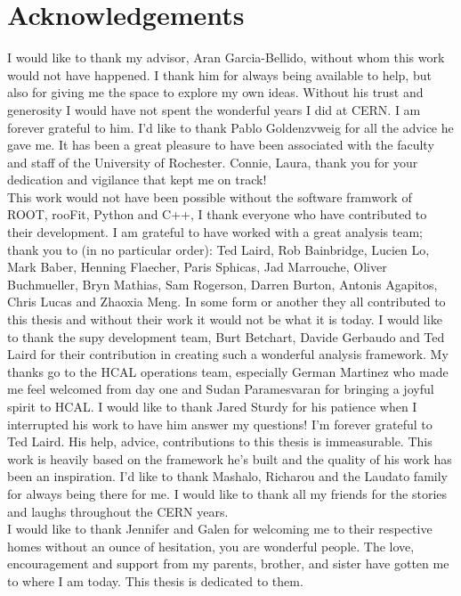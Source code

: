 \section*{Acknowledgements}

\indent I would like to thank my advisor, Aran Garcia-Bellido, without whom this work would not have happened. 
I thank him for always being available to help, but also for giving me the space to explore my own ideas. 
Without his trust and generosity I would have not spent the wonderful years I did at CERN. I am forever 
grateful to him. I'd like to thank Pablo Goldenzvweig for all the advice he gave me. It has been a great 
pleasure to have been associated with the faculty and staff of the University of Rochester. Connie, Laura, 
thank you for your dedication and vigilance that kept me on track! \\
\indent This work would not have been possible without the software framwork of ROOT, rooFit, Python and C++, I thank
everyone who have contributed to their development.  
\indent I am grateful to have worked with a great analysis team; thank you to (in no particular order): Ted Laird, 
Rob Bainbridge, Lucien Lo, Mark Baber, Henning Flaecher, Paris Sphicas, Jad Marrouche, Oliver Buchmueller, 
Bryn Mathias, Sam Rogerson, Darren Burton, Antonis Agapitos, Chris Lucas and Zhaoxia Meng. In some form or 
another they all contributed to this thesis and without their work it would not be what it is today. 
I would like to thank the supy development team, Burt Betchart, Davide Gerbaudo and Ted Laird for their contribution 
in creating such a wonderful analysis framework. My thanks go to the HCAL operations team, especially German 
Martinez who made me feel welcomed from day one and Sudan Paramesvaran for bringing a joyful spirit to HCAL.
I would like to thank Jared Sturdy for his patience when I interrupted his work to have him answer my questions! 
I'm forever grateful to Ted Laird. His help, advice, contributions to this thesis is immeasurable. This work is
heavily based on the framework he's built and the quality of his work has been an inspiration. I'd like to thank 
Mashalo, Richarou and the Laudato family for always being there for me. I would like to thank all my friends for 
the stories and laughs throughout the CERN years. \\
\indent I would like to thank Jennifer and Galen for welcoming me to their respective homes without
an ounce of hesitation, you are wonderful people. 
The love, encouragement and support from my parents, brother, and sister have gotten me to where I am today.
This thesis is dedicated to them. 
